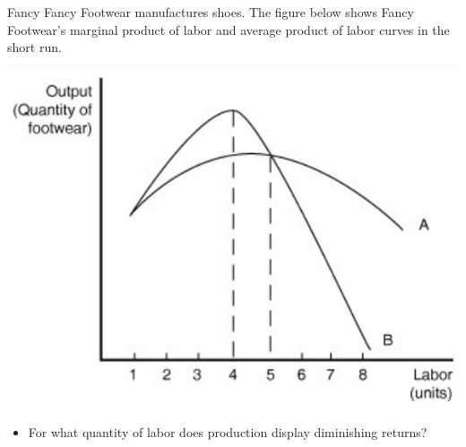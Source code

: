 \documentclass{beamer}
\begin{document}
\begin{frame}[t]{Fancy}
    Fancy Footwear manufactures shoes. The figure below shows Fancy Footwear's marginal product of labor and average product of labor curves in the short run.
    \begin{center}
        \includegraphics[scale = .6]{images/graph.png}
    \end{center}
    \begin{itemize}
        \item For what quantity of labor does production display diminishing returns?
    \end{itemize}
\end{frame}
\end{document}
